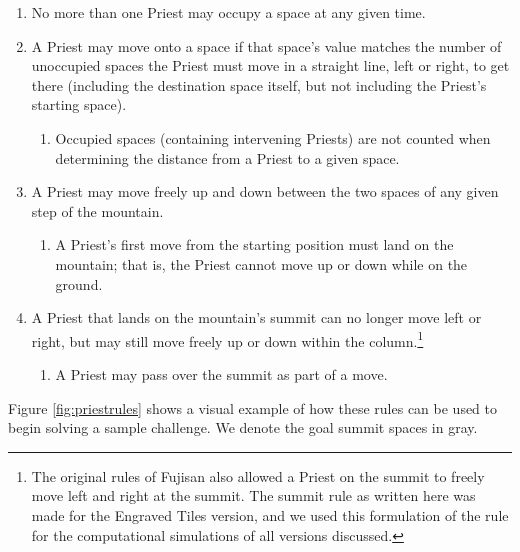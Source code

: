 \documentclass[journal]{IEEEtran}
\begin{document}
\begin{enumerate}
\item No more than one Priest may occupy a space at any given time.

\item A Priest may move onto a space if that space's value matches the number of unoccupied spaces the Priest must move in a straight line, left or right, to get there (including the destination space itself, but not including the Priest's starting space). %
\begin{enumerate}
\item Occupied spaces (containing intervening Priests) are not counted when determining the distance from a Priest to a given space. %
\end{enumerate}
\item A Priest may move freely up and down between the two spaces of any given step of the mountain. %
\begin{enumerate}
\item A Priest's first move from the starting position must land on the mountain; that is, the Priest cannot move up or down while on the ground.
\end{enumerate}

\item A Priest that lands on the mountain's summit can no longer move left or right, but may still move freely up or down within the column.\footnote{The original rules of Fujisan also allowed a Priest on the summit to freely move left and right at the summit. The summit rule as written here was made for the Engraved Tiles version, and we used this formulation of the rule for the computational simulations of all versions discussed.}
\begin{enumerate}
\item A Priest may pass over the summit as part of a move.
\end{enumerate}
\end{enumerate}

Figure \ref{fig:priestrules} shows a visual example of how these rules can be used to begin solving a sample challenge. We denote the goal summit spaces in gray. 
\end{document}
